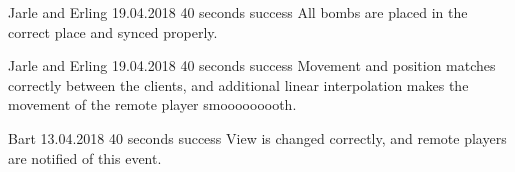 {Jarle and Erling}
{19.04.2018}
{40 seconds}
{success}
{All bombs are placed in the correct place and synced properly.}

{Jarle and Erling}
{19.04.2018}
{40 seconds}
{success}
{Movement and position matches correctly between the clients, and additional linear interpolation makes the movement of the remote player smooooooooth.}

{Bart}
{13.04.2018}
{40 seconds}
{success}
{View is changed correctly, and remote players are notified of this event.}
